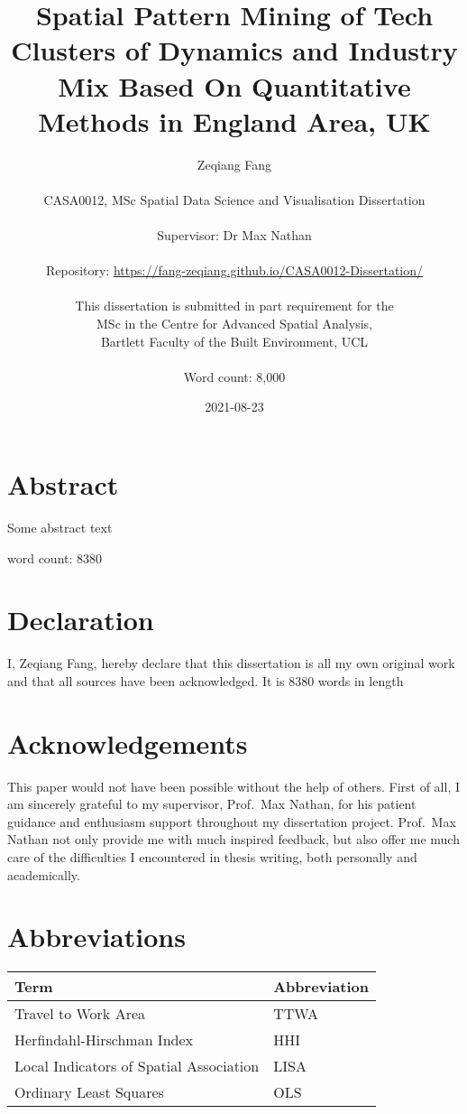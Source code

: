 \documentclass[
  12pt,
  oneside]{book}
\title{Spatial Pattern Mining of Tech Clusters of Dynamics and Industry Mix Based On Quantitative Methods in England Area, UK}
\author{Zeqiang Fang\\
~\\
CASA0012, MSc Spatial Data Science and Visualisation Dissertation\\
~\\
Supervisor: Dr Max Nathan\\
~\\
Repository: \url{https://fang-zeqiang.github.io/CASA0012-Dissertation/}\\
~\\
This dissertation is submitted in part requirement for the\\
MSc in the Centre for Advanced Spatial Analysis,\\
Bartlett Faculty of the Built Environment, UCL\\
~\\
Word count: 8,000}
\date{2021-08-23}
\begin{document}
\maketitle


\hypertarget{abstract}{%
\chapter*{Abstract}\label{abstract}}

Some abstract text

word count: 8380


\hypertarget{declaration}{%
\chapter*{Declaration}\label{declaration}}

I, Zeqiang Fang, hereby declare that this dissertation is all my own original work and that all sources have been acknowledged. It is 8380 words in length

\hypertarget{acknowledgements}{%
\chapter*{Acknowledgements}\label{acknowledgements}}

This paper would not have been possible without the help of others. First of all, I am sincerely grateful to my supervisor, Prof.~Max Nathan, for his patient guidance and enthusiasm support throughout my dissertation project. Prof.~Max Nathan not only provide me with much inspired feedback, but also offer me much care of the difficulties I encountered in thesis writing, both personally and academically.

\setcounter{tocdepth}{3}
\tableofcontents
\listoffigures
\listoftables

\hypertarget{abbreviations}{%
\chapter*{Abbreviations}\label{abbreviations}}

\begin{table}
\centering
\begin{tabular}{ll}
\toprule
\textbf{Term} & \textbf{Abbreviation}\\
\midrule
Travel to Work Area & TTWA\\
Herfindahl-Hirschman Index & HHI\\
Local Indicators of Spatial Association & LISA\\
Ordinary Least Squares & OLS\\
\bottomrule
\end{tabular}
\end{table}
\end{document}
